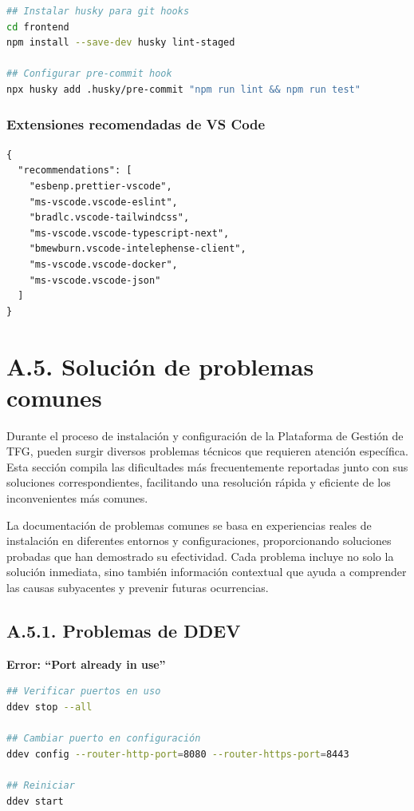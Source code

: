 \documentclass[12pt,a4paper,oneside]{report}
\begin{document}
\begin{lstlisting}[language=bash]
## Instalar husky para git hooks
cd frontend
npm install --save-dev husky lint-staged

## Configurar pre-commit hook
npx husky add .husky/pre-commit "npm run lint && npm run test"
\end{lstlisting}

\subsubsection{Extensiones recomendadas de VS
Code}\label{extensiones-recomendadas-de-vs-code}

\begin{lstlisting}
{
  "recommendations": [
    "esbenp.prettier-vscode",
    "ms-vscode.vscode-eslint",
    "bradlc.vscode-tailwindcss",
    "ms-vscode.vscode-typescript-next",
    "bmewburn.vscode-intelephense-client",
    "ms-vscode.vscode-docker",
    "ms-vscode.vscode-json"
  ]
}
\end{lstlisting}

\section{A.5. Solución de problemas
comunes}\label{a.5.-soluciuxf3n-de-problemas-comunes}

Durante el proceso de instalación y configuración de la Plataforma de
Gestión de TFG, pueden surgir diversos problemas técnicos que requieren
atención específica. Esta sección compila las dificultades más
frecuentemente reportadas junto con sus soluciones correspondientes,
facilitando una resolución rápida y eficiente de los inconvenientes más
comunes.

La documentación de problemas comunes se basa en experiencias reales de
instalación en diferentes entornos y configuraciones, proporcionando
soluciones probadas que han demostrado su efectividad. Cada problema
incluye no solo la solución inmediata, sino también información
contextual que ayuda a comprender las causas subyacentes y prevenir
futuras ocurrencias.

\subsection{A.5.1. Problemas de DDEV}\label{a.5.1.-problemas-de-ddev}

\textbf{Error: ``Port already in use''}

\begin{lstlisting}[language=bash]
## Verificar puertos en uso
ddev stop --all

## Cambiar puerto en configuración
ddev config --router-http-port=8080 --router-https-port=8443

## Reiniciar
ddev start
\end{lstlisting}
\end{document}
